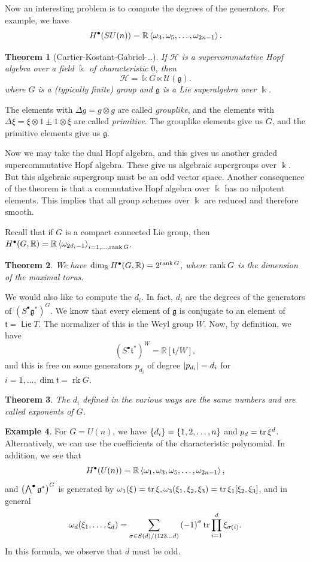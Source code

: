 \documentclass[leqno, openany]{memoir}
\newtheorem{thm}{Theorem}[section]
\theoremstyle{definition}
\newtheorem{exm}[thm]{Example}
\theoremstyle{remark}
\theoremstyle{plain}
\theoremstyle{definition}
\theoremstyle{remark}
\newcommand{\R}{\mathbb{R}}
\renewcommand{\k}{\Bbbk}
\newcommand{\mf}[1]{\mathfrak{#1}}
\DeclareMathOperator{\Lie}{\mathsf{Lie}}
\DeclareMathOperator{\rk}{rk}
\begin{document}
Now an interesting problem is to compute the degrees of the generators. For example, we have 
\[ H^{\bullet}(SU(n)) = \R \ev{\omega_3, \omega_5, \ldots, \omega_{2n-1}}. \]

\begin{thm}[Cartier-Kostant-Gabriel-\ldots]
    If $\mathscr{H}$ is a supercommutative Hopf algebra over a field $\k$ of characteristic $0$, then
    \[ \mathscr{H} = \k G \ltimes \mathscr{U}(\mf{g}). \]
    where $G$ is a (typically finite) group and $\mf{g}$ is a Lie superalgebra over $\k$.
\end{thm}

The elements with $\Delta g = g \otimes g$ are called \textit{grouplike}, and the elements with $\Delta \xi = \xi \otimes 1 \pm 1 \otimes \xi$ are called \textit{primitive}. The grouplike elements give us $G$, and the primitive elements give us $\mf{g}$. 

Now we may take the dual Hopf algebra, and this gives us another graded supercommutative Hopf algebra. These give us algebraic supergroups over $\k$. But this algebraic supergroup must be an odd vector space. Another consequence of the theorem is that a commutative Hopf algebra over $\k$ has no nilpotent elements. This implies that all group schemes over $\k$ are reduced and therefore smooth.

Recall that if $G$ is a compact connected Lie group, then $H^{\bullet}(G, \R) = \R \ev{\omega_{2d_i - 1}}_{i = 1, \ldots, \rank G}$.

\begin{thm}
    We have $\dim_{\R} H^{\bullet}(G, \R) = 2^{\rank G}$, where $\rank G$ is the dimension of the maximal torus.
\end{thm}

We would also like to compute the $d_i$. In fact, $d_i$ are the degrees of the generators of ${ ( S^{\bullet} \mf{g}^* ) }^G$. We know that every element of $\mf{g}$ is conjugate to an element of $\mf{t} = \Lie T$. The normalizer of this is the Weyl group $W$. Now, by definition, we have
\[ {(S^{\bullet} \mf{t}^*)}^W = \R[\mf{t}/W], \]
and this is free on some generators $p_{d_i}$ of degree $\abs{p_{d_i}} = d_i$ for $i = 1, \ldots, \dim \mf{t} = \rk G$.

\begin{thm}
    The $d_i$ defined in the various ways are the same numbers and are called \textit{exponents} of $G$.
\end{thm}

\begin{exm}
    For $G = U(n)$, we have $\qty{d_i} = \qty{1, 2, \ldots, n}$ and $p_d = \tr \xi^d$. Alternatively, we can use the coefficients of the characteristic polynomial. In addition, we see that
    \[ H^{\bullet}(U(n)) = \R \ev{\omega_1, \omega_3, \omega_5, \ldots, \omega_{2n-1}}, \]
    and ${\qty(\bigwedge^{\bullet} \mf{g}^*)}^G$ is generated by $\omega_1(\xi) = \tr \xi, \omega_3 (\xi_1, \xi_2, \xi_3) = \tr \xi_1 [\xi_2, \xi_3]$, and in general 
    \[ \omega_d(\xi_1, \ldots, \xi_d) = \sum_{\sigma \in S(d) / (123\ldots d)} {(-1)}^{\sigma} \tr \prod_{i=1}^d \xi_{\sigma(i)}. \]
    In this formula, we observe that $d$ must be odd.
\end{exm}
\end{document}
